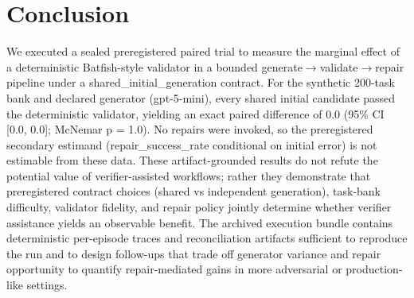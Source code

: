 \documentclass[conference]{IEEEtran}
\begin{document}
\section{Conclusion}
We executed a sealed preregistered paired trial to measure the marginal effect of a deterministic Batfish-style validator in a bounded generate\ensuremath{\rightarrow}validate\ensuremath{\rightarrow}repair pipeline under a shared\_initial\_generation contract. For the synthetic 200-task bank and declared generator (gpt-5-mini), every shared initial candidate passed the deterministic validator, yielding an exact paired difference of 0.0 (95\% CI [0.0, 0.0]; McNemar p = 1.0). No repairs were invoked, so the preregistered secondary estimand (repair\_success\_rate conditional on initial error) is not estimable from these data. These artifact-grounded results do not refute the potential value of verifier-assisted workflows; rather they demonstrate that preregistered contract choices (shared vs independent generation), task-bank difficulty, validator fidelity, and repair policy jointly determine whether verifier assistance yields an observable benefit. The archived execution bundle contains deterministic per-episode traces and reconciliation artifacts sufficient to reproduce the run and to design follow-ups that trade off generator variance and repair opportunity to quantify repair-mediated gains in more adversarial or production-like settings.
\end{document}
